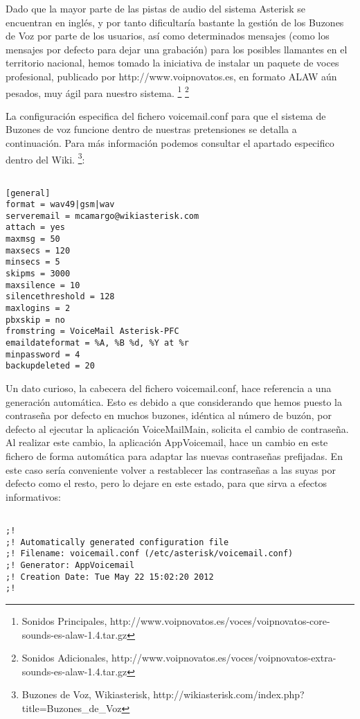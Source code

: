Dado que la mayor parte de las pistas de audio del sistema Asterisk se encuentran en inglés, y por tanto dificultaría bastante la gestión de los Buzones de Voz por parte de los usuarios, así como determinados mensajes (como los mensajes por defecto para dejar una grabación) para los posibles llamantes en el territorio nacional, hemos tomado la iniciativa de instalar un paquete de voces profesional, publicado por http://www.voipnovatos.es, en formato ALAW aún pesados, muy ágil para nuestro sistema. \footnote{Sonidos Principales, http://www.voipnovatos.es/voces/voipnovatos-core-sounds-es-alaw-1.4.tar.gz} \footnote{Sonidos Adicionales, http://www.voipnovatos.es/voces/voipnovatos-extra-sounds-es-alaw-1.4.tar.gz}

La configuración especifica del fichero voicemail.conf para que el sistema de Buzones de voz funcione dentro de nuestras pretensiones se detalla a continuación. Para más información podemos consultar el apartado especifico dentro del Wiki. \footnote{Buzones de Voz, Wikiasterisk, http://wikiasterisk.com/index.php?title=Buzones\_de\_Voz}:

\begin{lstlisting}[style=bash,title={/etc/asterisk/voicemail.conf}]

[general]
format = wav49|gsm|wav
serveremail = mcamargo@wikiasterisk.com
attach = yes
maxmsg = 50
maxsecs = 120
minsecs = 5
skipms = 3000
maxsilence = 10
silencethreshold = 128
maxlogins = 2
pbxskip = no
fromstring = VoiceMail Asterisk-PFC
emaildateformat = %A, %B %d, %Y at %r
minpassword = 4
backupdeleted = 20

\end{lstlisting}

Un dato curioso, la cabecera del fichero voicemail.conf, hace referencia a una generación automática. Esto es debido a que considerando que hemos puesto la contraseña por defecto en muchos buzones, idéntica al número de buzón, por defecto al ejecutar la aplicación VoiceMailMain, solicita el cambio de contraseña. Al realizar este cambio, la aplicación AppVoicemail, hace un cambio en este fichero de forma automática para adaptar las nuevas contraseñas prefijadas. En este caso sería conveniente volver a restablecer las contraseñas a las suyas por defecto como el resto, pero lo dejare en este estado, para que sirva a efectos informativos:

\begin{lstlisting}[style=bash,title={/etc/asterisk/voicemail.conf}]

;!
;! Automatically generated configuration file
;! Filename: voicemail.conf (/etc/asterisk/voicemail.conf)
;! Generator: AppVoicemail
;! Creation Date: Tue May 22 15:02:20 2012
;!

\end{lstlisting}

